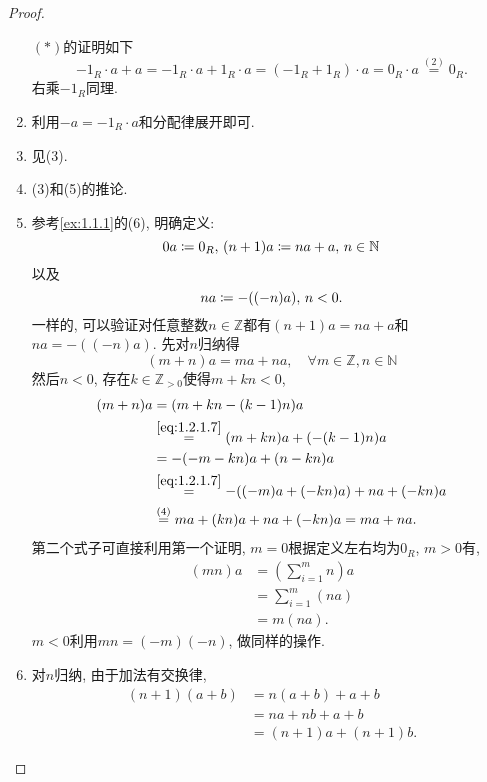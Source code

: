 \begin{proof}
\begin{enumerate}[(1)]
        $(*)$的证明如下
        \[
            -1_R \cdot a + a = -1_R \cdot a + 1_R \cdot a = (-1_R + 1_R) \cdot a = 0_R \cdot a \overset{(2)}= 0_R.
        \]
        右乘$-1_R$同理.
        \item 利用$-a = -1_R \cdot a$和分配律展开即可.
        \item 见(3).
        \item (3)和(5)的推论.
        \item 参考\ref{ex:1.1.1}的(6), 明确定义: 
        \[
            0a \mathrel{\coloneqq} 0_R,\, (n + 1)a \mathrel{\coloneqq} na + a,\, n \in \mathbb{N}
        \]
        以及
        \[
            na \mathrel{\coloneqq} -((-n)a),\, n < 0.
        \]
        一样的, 可以验证对任意整数$n \in \mathbb{Z}$都有$(n + 1)a = na + a$和$na = -((-n)a)$. 先对$n$归纳得
        \begin{equation}
            (m + n)a = ma + na, \quad \forall m \in \mathbb{Z}, n \in \mathbb{N}
            \tag{i}
            \label{eq:1.2.1.7}
        \end{equation}
        然后$n < 0$, 存在$k\in \mathbb{Z}_{>0}$使得$m + kn < 0$,
        \[
        \begin{aligned}
            (m + n)a &= (m + kn - (k - 1)n)a\\
            &\overset{\eqref{eq:1.2.1.7}}= (m + kn)a + (-(k - 1)n)a\\
            &= -(-m - kn)a + (n - kn)a\\
            &\overset{\eqref{eq:1.2.1.7}}= -((-m)a + (-kn)a) + na + (-kn)a\\
            &\overset{(4)}= ma + (kn)a + na + (-kn)a = ma + na.
        \end{aligned}
        \]
        第二个式子可直接利用第一个证明, $m = 0$根据定义左右均为$0_R$, $m > 0$有,
        \[
        \begin{aligned}
            (mn)a &= \left(\sum_{i = 1}^{m} n\right)a\\
            &= \sum_{i = 1}^{m} (na)\\
            &= m(na).
        \end{aligned}
        \]
        $m < 0$利用$mn = (-m)(-n)$, 做同样的操作.
        \item 对$n$归纳, 由于加法有交换律,
        \[
        \begin{aligned}
            (n + 1)(a + b) &= n(a + b) + a + b\\
            &= na + nb + a + b\\
            &= (n + 1)a + (n + 1)b.
        \end{aligned}
\]
\end{enumerate}
\end{proof}
